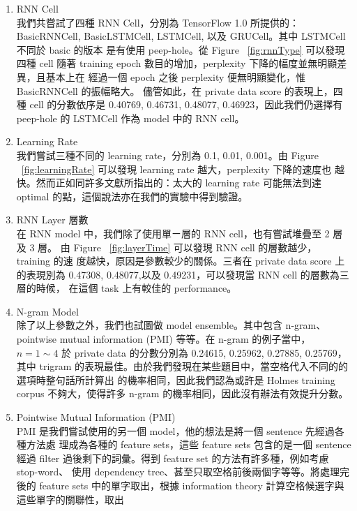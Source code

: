 \documentclass[12pt, a4paper]{article}
\theoremstyle{mystyle}	%
\begin{document}
\begin{enumerate}
  \item RNN Cell\\
    我們共嘗試了四種 RNN Cell，分別為 TensorFlow 1.0 所提供的：BasicRNNCell, 
    BasicLSTMCell, LSTMCell, 以及 GRUCell。其中 LSTMCell 不同於 basic 的版本
    是有使用 peep-hole。從 Figure ~\ref{fig:rnnType} 可以發現四種 cell 隨著 
    training epoch 數目的增加，perplexity 下降的幅度並無明顯差異，且基本上在
    經過一個 epoch 之後 perplexity 便無明顯變化，惟 BasicRNNCell 的振幅略大。
    儘管如此，在 private data score 的表現上，四種 cell 的分數依序是 
    0.40769, 0.46731, 0.48077, 0.46923，因此我們仍選擇有 peep-hole 的 
    LSTMCell 作為 model 中的 RNN cell。
  \item Learning Rate\\
    我們嘗試三種不同的 learning rate，分別為 0.1, 0.01, 0.001。由 Figure 
    ~\ref{fig:learningRate} 可以發現 learning rate 越大，perplexity 下降的速度也
    越快。然而正如同許多文獻所指出的：太大的 learning rate 可能無法到達 optimal 
    的點，這個說法亦在我們的實驗中得到驗證。
  \item RNN Layer 層數\\
    在 RNN model 中，我們除了使用單ㄧ層的 RNN cell，也有嘗試堆疊至 2 層及 3 層。
    由 Figure ~\ref{fig:layerTime} 可以發現 RNN cell 的層數越少， training 的速
    度越快，原因是參數較少的關係。三者在 private data score 上的表現別為
    0.47308, 0.48077,以及 0.49231，可以發現當 RNN cell 的層數為三層的時候，
    在這個 task 上有較佳的 performance。
  \item N-gram Model\\
    除了以上參數之外，我們也試圖做 model ensemble。其中包含 n-gram、pointwise
    mutual information (PMI) 等等。在 n-gram 的例子當中，$n = 1 \sim 4$ 於
    private data 的分數分別為 0.24615, 0.25962, 0.27885, 0.25769，其中 trigram 
    的表現最佳。由於我們發現在某些題目中，當空格代入不同的的選項時整句話所計算出
    的機率相同，因此我們認為或許是 Holmes training corpus 不夠大，使得許多 
    n-gram 的機率相同，因此沒有辦法有效提升分數。
  \item Pointwise Mutual Information (PMI)\\
    PMI 是我們嘗試使用的另一個 model，他的想法是將一個 sentence 先經過各種方法處
    理成為各種的 feature sets，這些 feature sets 包含的是一個 sentence 經過 
    filter 過後剩下的詞彙。得到 feature set 的方法有許多種，例如考慮 stop-word、
    使用 dependency tree、甚至只取空格前後兩個字等等。將處理完後的 feature sets 
    中的單字取出，根據 information theory 計算空格候選字與這些單字的關聯性，取出

\end{enumerate}
\end{document}
